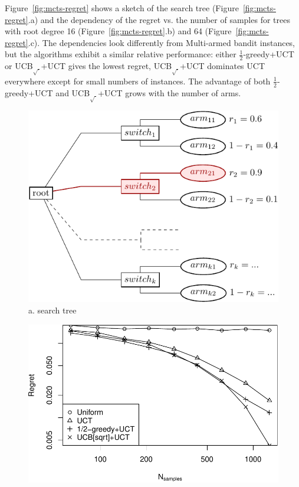 \documentclass[letterpaper]{article}
\begin{document}
Figure~\ref{fig:mcts-regret} shows a sketch of the search tree
(Figure~\ref{fig:mcts-regret}.a) and the dependency of the regret vs. the
number of samples for trees with root degree 16
(Figure~\ref{fig:mcts-regret}.b) and 64 (Figure~\ref{fig:mcts-regret}.c). The
dependencies look differently from Multi-armed bandit instances, but
the algorithms exhibit a similar relative performance: either $\frac 1
2$-greedy+UCT or UCB$_{\sqrt{\cdot}}$+UCT
gives the lowest regret, UCB$_{\sqrt{\cdot}}$+UCT dominates UCT everywhere
except for small numbers of instances. The advantage of both $\frac 1
2$-greedy+UCT and UCB$_{\sqrt{\cdot}}$+UCT grows with the number of arms.

\begin{figure}[h!]
  \begin{minipage}[c]{1.0\linewidth}
    \centering
    \includegraphics[scale=0.7]{twolevel-tree.pdf}\\
    a. search tree
    \vspace{0.5em}
  \end{minipage}
  \begin{minipage}[c]{1.0\linewidth}
    \centering
    \includegraphics[scale=0.45]{tree-identity-k=16-uqb=8.pdf}\\ 

\end{minipage}
\end{figure}
\end{document}
